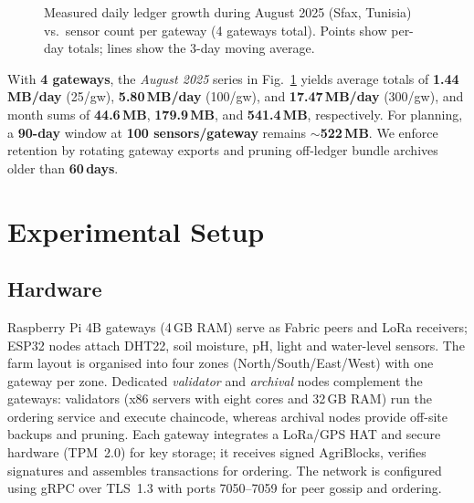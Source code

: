 \documentclass[12pt,onecolumn]{IEEEtran} %
\begin{document}
\begin{figure}[htbp]

  \caption{Measured daily ledger growth during August 2025 (Sfax, Tunisia) vs.\ sensor count per gateway (4 gateways total). Points show per-day totals; lines show the 3-day moving average.}
  \label{fig:capacity-growth}
\end{figure}



With \textbf{4 gateways}, the \emph{August 2025} series in Fig.~\ref{fig:capacity-growth} yields average totals of
\textbf{1.44\,MB/day} (25/gw), \textbf{5.80\,MB/day} (100/gw), and \textbf{17.47\,MB/day} (300/gw),
and month sums of \textbf{44.6\,MB}, \textbf{179.9\,MB}, and \textbf{541.4\,MB}, respectively.
For planning, a \textbf{90-day} window at \textbf{100 sensors/gateway} remains $\sim$\textbf{522\,MB}.
We enforce retention by rotating gateway exports and pruning off-ledger bundle archives older than \textbf{60\,days}.




\section{Experimental Setup}
\label{sec:experimental-setup}

\subsection{Hardware}
\label{subsec:hardware}
Raspberry Pi 4B gateways (4\,GB RAM) serve as Fabric peers and LoRa receivers; ESP32 nodes attach DHT22, soil moisture, pH, light and water-level sensors. The farm layout is organised into four zones (North/South/East/West) with one gateway per zone. Dedicated \emph{validator} and \emph{archival} nodes complement the gateways: validators (x86 servers with eight cores and 32\,GB RAM) run the ordering service and execute chaincode, whereas archival nodes provide off-site backups and pruning. Each gateway integrates a LoRa/GPS HAT and secure hardware (TPM~2.0) for key storage; it receives signed AgriBlocks, verifies signatures and assembles transactions for ordering. The network is configured using gRPC over TLS~1.3 with ports 7050–7059 for peer gossip and ordering.
\end{document}
